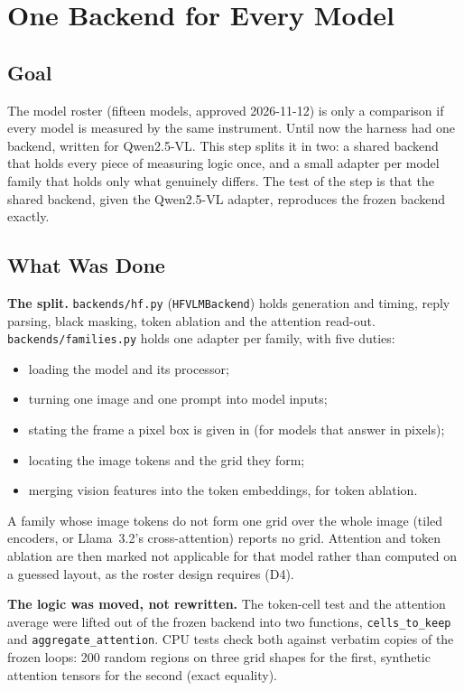 \chapter{One Backend for Every Model}
\label{chap:s2-9}

\section{Goal}

The model roster (fifteen models, approved 2026-11-12) is only a comparison if every model is measured
by the same instrument. Until now the harness had one backend, written for Qwen2.5-VL. This step splits
it in two: a shared backend that holds every piece of measuring logic once, and a small adapter per model
family that holds only what genuinely differs. The test of the step is that the shared backend, given the
Qwen2.5-VL adapter, reproduces the frozen backend exactly.

\section{What Was Done}

\textbf{The split.} \texttt{backends/hf.py} (\texttt{HFVLMBackend}) holds generation and timing, reply
parsing, black masking, token ablation and the attention read-out. \texttt{backends/families.py} holds
one adapter per family, with five duties:
\begin{itemize}
\item loading the model and its processor;
\item turning one image and one prompt into model inputs;
\item stating the frame a pixel box is given in (for models that answer in pixels);
\item locating the image tokens and the grid they form;
\item merging vision features into the token embeddings, for token ablation.
\end{itemize}
A family whose image tokens do not form one grid over the whole image (tiled encoders, or Llama~3.2's
cross-attention) reports no grid. Attention and token ablation are then marked not applicable for that
model rather than computed on a guessed layout, as the roster design requires (D4).

\textbf{The logic was moved, not rewritten.} The token-cell test and the attention average were lifted out
of the frozen backend into two functions, \texttt{cells\_to\_keep} and \texttt{aggregate\_attention}. CPU
tests check both against verbatim copies of the frozen loops: 200 random regions on three grid shapes for
the first, synthetic attention tensors for the second (exact equality).

